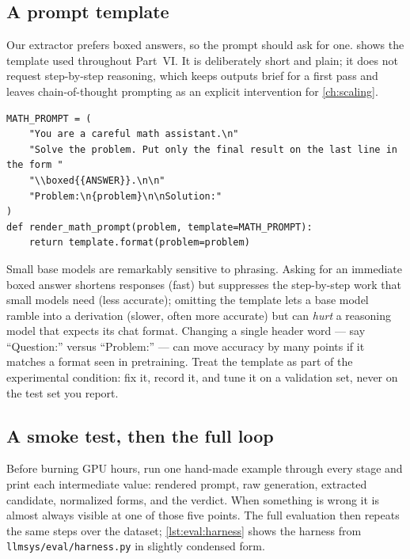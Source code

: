 \subsection{A prompt template}
Our extractor prefers boxed answers, so the prompt should ask for one.
 shows the template used throughout Part~VI. It is deliberately short and
plain; it does not request step-by-step reasoning, which keeps outputs brief for a first pass
and leaves chain-of-thought prompting as an explicit intervention for \cref{ch:scaling}.

\begin{lstlisting}[caption={The math prompt template.},label={lst:eval:prompt}]
MATH_PROMPT = (
    "You are a careful math assistant.\n"
    "Solve the problem. Put only the final result on the last line in the form "
    "\\boxed{{ANSWER}}.\n\n"
    "Problem:\n{problem}\n\nSolution:"
)
def render_math_prompt(problem, template=MATH_PROMPT):
    return template.format(problem=problem)
\end{lstlisting}

\begin{keyidea}
Small base models are remarkably sensitive to phrasing. Asking for an immediate boxed answer
shortens responses (fast) but suppresses the step-by-step work that small models need (less
accurate); omitting the template lets a base model ramble into a derivation (slower, often more
accurate) but can \emph{hurt} a reasoning model that expects its chat format. Changing a single
header word --- say ``Question:'' versus ``Problem:'' --- can move accuracy by many points if it
matches a format seen in pretraining. Treat the template as part of the experimental condition:
fix it, record it, and tune it on a validation set, never on the test set you report.
\end{keyidea}

\subsection{A smoke test, then the full loop}
Before burning GPU hours, run one hand-made example through every stage and print each
intermediate value: rendered prompt, raw generation, extracted candidate, normalized forms, and
the verdict. When something is wrong it is almost always visible at one of those five points.
The full evaluation then repeats the same steps over the dataset; \cref{lst:eval:harness} shows the
harness from \texttt{llmsys/eval/harness.py} in slightly condensed form.

